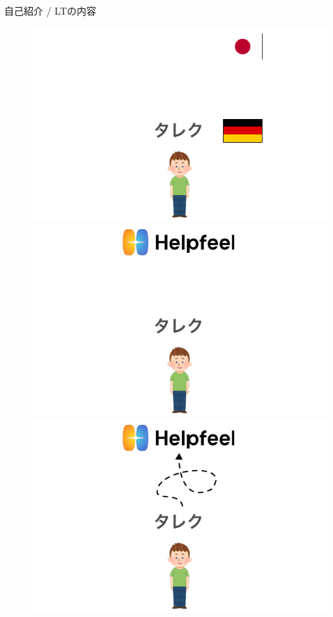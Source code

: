 \documentclass[lualatex,aspectratio=169]{beamer}
\begin{document}
\begin{frame}[t]{自己紹介 / LTの内容}
\begin{figure}
\begin{overprint}
            \begin{center}\includegraphics[width=0.8\linewidth]{./img/intro_1-2.pdf}\end{center}
            \begin{center}\includegraphics[width=0.8\linewidth]{./img/intro_2.pdf}\end{center}
            \begin{center}\includegraphics[width=0.8\linewidth]{./img/intro_3.pdf}\end{center}
        \end{overprint}
    \end{figure}
\end{frame}
\end{document}
